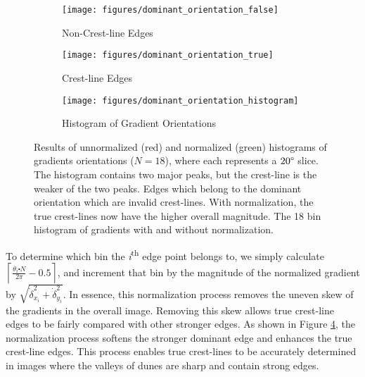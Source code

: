   \begin{figure}
  	\centering
  	\begin{subfigure}{0.48\textwidth}
  		\centering
  		\texttt{[image: figures/dominant\_orientation\_false]}
  		\caption{Non-Crest-line Edges}
  		\label{fig:false_dominant_orientation_image}
  	\end{subfigure}
  	\begin{subfigure}{0.48\textwidth}
  		\centering
  		\texttt{[image: figures/dominant\_orientation\_true]}
  		\caption{Crest-line Edges}
  		\label{fig:true_dominant_orientation_image}
  	\end{subfigure}
  	\begin{subfigure}{\textwidth}
  		\centering
  		\texttt{[image: figures/dominant\_orientation\_histogram]}
  		\caption{Histogram of Gradient Orientations}
  		\label{fig:dominant_orientation_histogram}
  	\end{subfigure}
  	\caption{Results of unnormalized (red) and normalized (green) histograms of gradients orientations ($N=18$), where each represents a $20\degree$ slice. The histogram contains two major peaks, but the crest-line is the weaker of the two peaks.  Edges which belong to the dominant orientation which are invalid crest-lines.  With normalization, the true crest-lines now have the higher overall magnitude.  The 18 bin histogram of gradients with and without normalization.}
  	\label{fig:computing_dominant_orientation}
  \end{figure}
  
  To determine which bin the \emph{i}\textsuperscript{th} edge point belongs to, we simply calculate $\left\lceil \frac{\dot{\theta_{i}}\centerdot N}{2\pi}-0.5\right\rceil $,	and increment that bin by the magnitude of the normalized gradient	by $\sqrt{\dot{\delta}_{x_{i}}^{2}+\dot{\delta}_{y_{i}}^{2}}$. In essence, this normalization process removes the uneven skew of the gradients in the overall image. Removing this skew allows true crest-line edges to be fairly compared with other stronger edges. As shown in Figure \ref{fig:computing_dominant_orientation}, the normalization process softens the stronger dominant edge and enhances the true crest-line edges. This process enables true crest-lines to be accurately determined in images where the valleys of dunes are sharp and contain strong edges.
  
